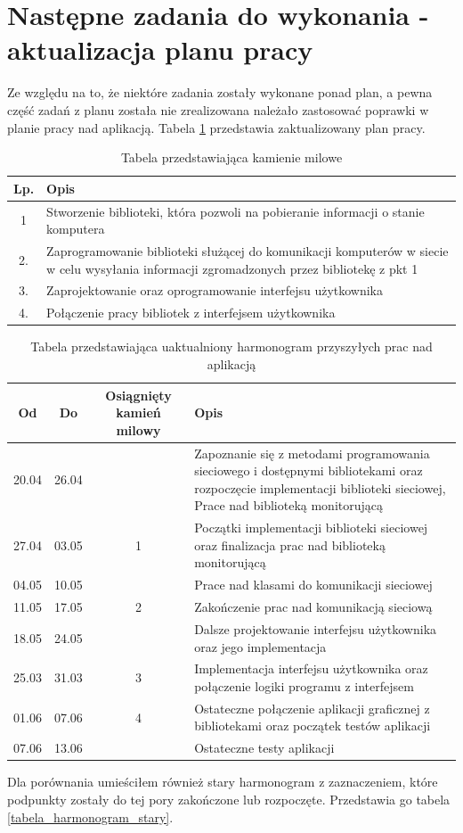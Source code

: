 \documentclass[a4paper]{article}
\begin{document}
\section{Następne zadania do wykonania - aktualizacja planu pracy}
Ze względu na to, że niektóre zadania zostały wykonane ponad plan, a pewna część zadań z planu została nie zrealizowana należało zastosować poprawki w planie pracy nad aplikacją. Tabela \ref{tabela_harmonogram} przedstawia zaktualizowany plan pracy.
\begin{table}[h]
			\centering
			\begin{tabularx}{0.65\textwidth}{|c|X|}
				\hline
				Lp. & Opis \\ \hline
				1 & Stworzenie biblioteki, która pozwoli na pobieranie informacji o stanie komputera \\ \hline
				2. & Zaprogramowanie biblioteki służącej do komunikacji komputerów w siecie w celu wysyłania informacji zgromadzonych przez bibliotekę z pkt 1 \\ \hline
				3. & Zaprojektowanie oraz oprogramowanie interfejsu użytkownika \\ \hline
				4. & Połączenie pracy bibliotek z interfejsem użytkownika \\ \hline
			\end{tabularx}
			\caption{Tabela przedstawiająca kamienie milowe}
		\end{table}
\begin{table}[h]
			\centering
			\begin{tabularx}{\linewidth}{|c|c|c|X|}
				\hline
				Od & Do & Osiągnięty kamień milowy & Opis \\ \hline
				20.04 & 26.04 &  & Zapoznanie się z metodami programowania sieciowego i dostępnymi bibliotekami oraz  rozpoczęcie implementacji biblioteki sieciowej, Prace nad biblioteką monitorującą\\ \hline
				27.04 & 03.05 & 1 & Początki implementacji biblioteki sieciowej oraz finalizacja prac nad biblioteką monitorującą \\ \hline
				04.05 & 10.05 &  & Prace nad klasami do komunikacji sieciowej \\ \hline
				11.05 & 17.05 & 2  & Zakończenie prac nad komunikacją sieciową  \\ \hline
				18.05 & 24.05 &  & Dalsze projektowanie interfejsu użytkownika oraz jego implementacja \\ \hline
				25.03 & 31.03 & 3 & Implementacja interfejsu użytkownika oraz połączenie logiki programu z interfejsem \\ \hline
				01.06 & 07.06 & 4 & Ostateczne połączenie aplikacji graficznej z bibliotekami oraz początek testów aplikacji \\ \hline
				07.06 & 13.06 &  & Ostateczne testy aplikacji \\ \hline
			\end{tabularx}
			\caption{Tabela przedstawiająca uaktualniony harmonogram przyszyłych prac nad aplikacją}
			\label{tabela_harmonogram}
		\end{table}
Dla porównania umieściłem również stary harmonogram z zaznaczeniem, które podpunkty zostały do tej pory zakończone lub rozpoczęte. Przedstawia go tabela \ref{tabela_harmonogram_stary}.
\end{document}
